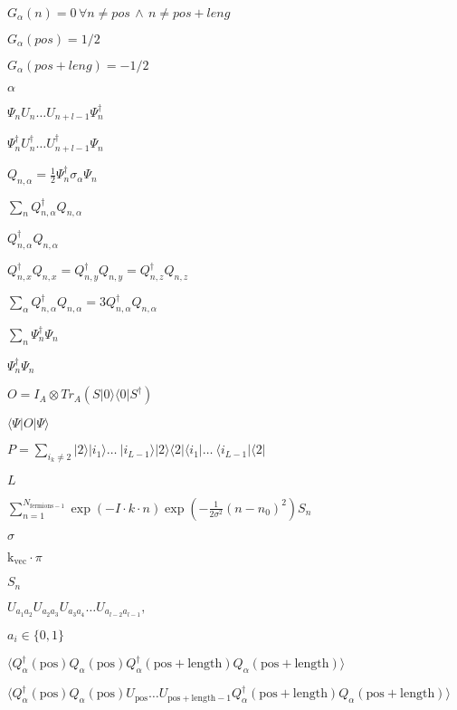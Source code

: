 \documentclass{article}
\begin{document}
{$ G_\alpha(n)=0\,\forall n\neq pos \,\wedge\, n\neq pos+leng $
\pagebreak

$ G_\alpha(pos)=1/2 $
\pagebreak

$ G_\alpha(pos+leng)=-1/2 $
\pagebreak

$ \alpha $
\pagebreak

$ \Psi_nU_n\dots U_{n+l-1}\Psi^\dagger_n $
\pagebreak

$ \Psi_n^\dagger U_n^\dagger\dots U_{n+l-1}^\dagger\Psi_n $
\pagebreak

$ Q_{n,\alpha}= \frac{1}{2} \Psi_n^\dagger\sigma_\alpha\Psi_n $
\pagebreak

$\sum_n Q_{n,\alpha}^\dagger Q_{n,\alpha} $
\pagebreak

$ Q_{n,\alpha}^\dagger Q_{n,\alpha} $
\pagebreak

$ Q_{n,x}^\dagger Q_{n,x}=Q_{n,y}^\dagger Q_{n,y}=Q_{n,z}^\dagger Q_{n,z} $
\pagebreak

$ \sum_\alpha Q_{n,\alpha}^\dagger Q_{n,\alpha} = 3Q_{n,\alpha}^\dagger Q_{n,\alpha} $
\pagebreak

$ \sum_n \Psi_{n}^\dagger \Psi_{n} $
\pagebreak

$ \Psi_{n}^\dagger \Psi_{n} $
\pagebreak

$ O=I_A\otimes Tr_A(S|0\rangle\langle 0|S^\dagger) $
\pagebreak

$ \langle\Psi|O|\Psi\rangle $
\pagebreak

$ P=\sum_{i_k\neq 2}|2\rangle |i_1\rangle \dots \ |i_{L-1}\rangle|2\rangle \langle 2| \langle i_1| \dots \ \langle i_{L-1}|\langle 2| $
\pagebreak

$ L $
\pagebreak

$ \sum_{n=1}^{N_\mathrm{fermions-1}} \exp(-I\cdot k\cdot n)\exp\left(-\frac{1}{2\sigma^2}(n-n_0)^2\right) S_n$
\pagebreak

$ \sigma $
\pagebreak

$\mathrm{k}_\mathrm{vec}\cdot \pi $
\pagebreak

$ S_n $
\pagebreak

$ U_{a_1a_2}U_{a_2a_3}U_{a_3a_4}\dots U_{a_{l-2}a_{l-1}}, $
\pagebreak

$ a_i\in\{0,1\} $
\pagebreak

$ \langle Q^\dagger_\alpha(\mathrm{pos})Q_\alpha(\mathrm{pos}) Q^\dagger_\alpha(\mathrm{pos+length})Q_\alpha(\mathrm{pos+length})\rangle $
\pagebreak

$ \langle Q^\dagger_\alpha(\mathrm{pos})Q_\alpha(\mathrm{pos})U_\mathrm{pos}\dots U_\mathrm{pos+length-1} Q^\dagger_\alpha(\mathrm{pos+length})Q_\alpha(\mathrm{pos+length})\rangle $
\pagebreak

}
\end{document}
